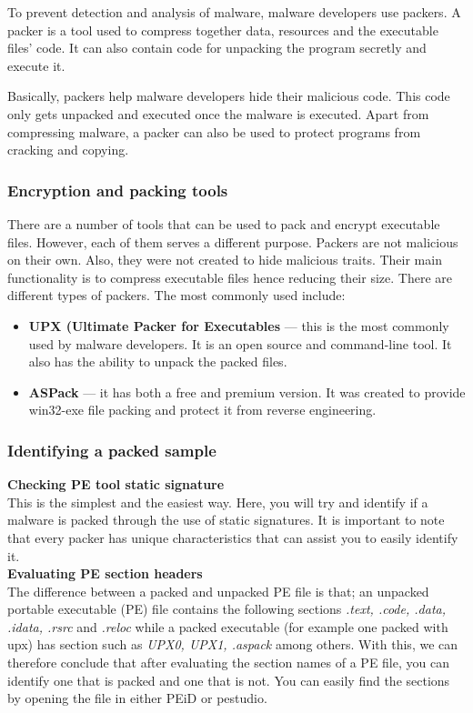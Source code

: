 To prevent detection and analysis of malware, malware developers use packers. A packer is a tool used to compress together data, resources and the executable files' code. It can also contain code for unpacking the program secretly and execute it.

Basically, packers help malware developers hide their malicious code. This code only gets unpacked and executed once the malware is executed. Apart from compressing malware, a packer can also be used to protect programs from cracking and copying.

\subsubsection{Encryption and packing tools}
There are a number of tools that can be used to pack and encrypt executable files. However, each of them serves a different purpose. Packers are not malicious on their own. Also, they were not created to hide malicious traits. Their main functionality is to compress executable files hence reducing their size. There are different types of packers. The most commonly used include:\\

\begin{itemize}
    \item \textbf{UPX (Ultimate Packer for Executables} — this is the most commonly used by malware developers. It is an open source and command-line tool. It also has the ability to unpack the packed files.
    \item \textbf{ASPack} — it has both a free and premium version. It was created to provide win32-exe file packing and protect it from reverse engineering.
\end{itemize}

\subsubsection{Identifying a packed sample}

\textbf{Checking PE tool static signature}\\
This is the simplest and the easiest way. Here, you will try and identify if a malware is packed through the use of static signatures. It is important to note that every packer has unique characteristics that can assist you to easily identify it.\\

\textbf{Evaluating PE section headers}\\
The difference between a packed and unpacked PE file is that; an unpacked portable executable (PE) file contains the following sections \textit{.text, .code, .data, .idata, .rsrc} and \textit{.reloc} while a packed executable (for example one packed with upx) has section such as \textit{UPX0, UPX1, .aspack} among others.
With this, we can therefore conclude that after evaluating the section names of a PE file, you can identify one that is packed and one that is not. You can easily find the sections by opening the file in either PEiD or pestudio.\\

